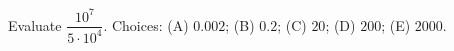 Evaluate $\dfrac{10^7}{5\cdot10^4}$. Choices: (A) $0.002$; (B) $0.2$; (C) $20$; (D) $200$; (E) $2000$.
